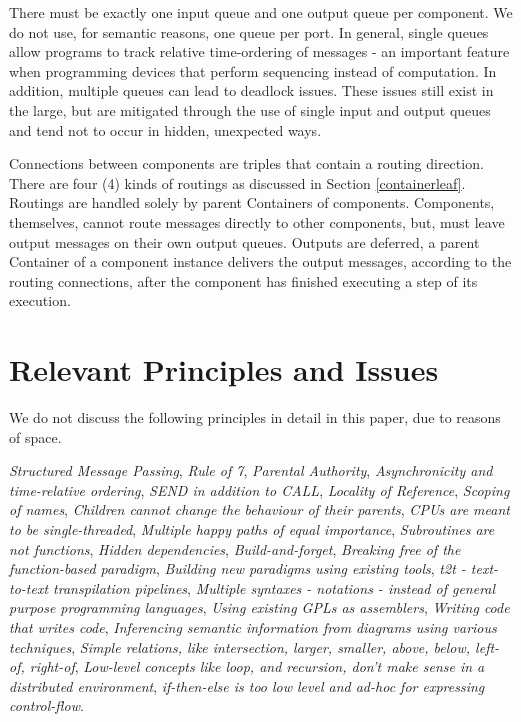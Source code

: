 \documentclass[10pt,anonymous,review]{acmart}
\begin{document}
There must be exactly one input queue and one output queue per component. We
do not use, for semantic reasons, one queue per port. In general, single
queues allow programs to track relative time-ordering of messages - an
important feature when programming devices that perform sequencing
instead of computation. In addition, multiple queues can lead to
deadlock issues. These issues still exist in the large, but are
mitigated through the use of single input and output queues and tend not
to occur in hidden, unexpected ways.

Connections between components are triples that contain a routing direction.
There are four (4) kinds of routings as discussed in Section \ref{containerleaf}.
Routings are handled solely by parent Containers of components. Components, themselves, cannot route messages directly to other components, but, must leave output messages on their own output queues. Outputs are deferred, a parent Container of a component instance delivers the output messages, according to the routing connections, after the component has finished executing a step of its execution.


\section{Relevant Principles and Issues}
We do not discuss the following principles in detail in this paper, due
to reasons of space.

\emph{Structured Message Passing},
\emph{Rule of 7},
\emph{Parental Authority},
\emph{Asynchronicity and time-relative ordering},
\emph{SEND in addition to CALL},
\emph{Locality of Reference},
\emph{Scoping of names},
\emph{Children cannot change the behaviour of their parents},
\emph{CPUs are meant to be single-threaded},
\emph{Multiple happy paths of equal importance},
\emph{Subroutines are not functions},
\emph{Hidden dependencies},
\emph{Build-and-forget},
\emph{Breaking free of the function-based paradigm},
\emph{Building new paradigms using existing tools},
\emph{t2t - text-to-text transpilation pipelines},
\emph{Multiple syntaxes - notations - instead of general purpose programming languages},
\emph{Using existing GPLs as assemblers},
\emph{Writing code that writes code},
\emph{Inferencing semantic information from diagrams using various techniques},
\emph{Simple relations, like intersection, larger, smaller, above, below, left-of, right-of},
\emph{Low-level concepts like \emph{loop}, and \emph{recursion}, don't make sense in a distributed environment},
\emph{if-then-else is too low level and ad-hoc for expressing control-flow}.
\end{document}

